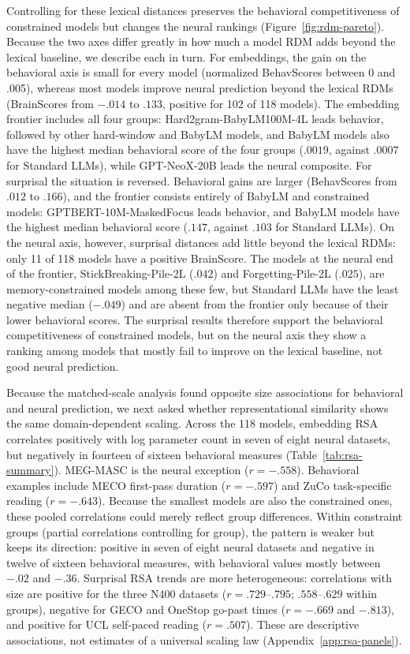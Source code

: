 Controlling for these lexical distances preserves the behavioral competitiveness of constrained models but changes the neural rankings (Figure~\ref{fig:rdm-pareto}). Because the two axes differ greatly in how much a model RDM adds beyond the lexical baseline, we describe each in turn. For embeddings, the gain on the behavioral axis is small for every model (normalized BehavScores between 0 and .005), whereas most models improve neural prediction beyond the lexical RDMs (BrainScores from $-.014$ to $.133$, positive for 102 of 118 models). The embedding frontier includes all four groups: Hard2gram-BabyLM100M-4L leads behavior, followed by other hard-window and BabyLM models, and BabyLM models also have the highest median behavioral score of the four groups ($.0019$, against $.0007$ for Standard LLMs), while GPT-NeoX-20B leads the neural composite. For surprisal the situation is reversed. Behavioral gains are larger (BehavScores from $.012$ to $.166$), and the frontier consists entirely of BabyLM and constrained models: GPTBERT-10M-MaskedFocus leads behavior, and BabyLM models have the highest median behavioral score ($.147$, against $.103$ for Standard LLMs). On the neural axis, however, surprisal distances add little beyond the lexical RDMs: only 11 of 118 models have a positive BrainScore. The models at the neural end of the frontier, StickBreaking-Pile-2L ($.042$) and Forgetting-Pile-2L ($.025$), are memory-constrained models among these few, but Standard LLMs have the least negative median ($-.049$) and are absent from the frontier only because of their lower behavioral scores. The surprisal results therefore support the behavioral competitiveness of constrained models, but on the neural axis they show a ranking among models that mostly fail to improve on the lexical baseline, not good neural prediction.

Because the matched-scale analysis found opposite size associations for behavioral and neural prediction, we next asked whether representational similarity shows the same domain-dependent scaling. Across the 118 models, embedding RSA correlates positively with log parameter count in seven of eight neural datasets, but negatively in fourteen of sixteen behavioral measures (Table~\ref{tab:rsa-summary}). MEG-MASC is the neural exception ($r=-.558$). Behavioral examples include MECO first-pass duration ($r=-.597$) and ZuCo task-specific reading ($r=-.643$). Because the smallest models are also the constrained ones, these pooled correlations could merely reflect group differences. Within constraint groups (partial correlations controlling for group), the pattern is weaker but keeps its direction: positive in seven of eight neural datasets and negative in twelve of sixteen behavioral measures, with behavioral values mostly between $-.02$ and $-.36$. Surprisal RSA trends are more heterogeneous: correlations with size are positive for the three N400 datasets ($r=.729$--$.795$; $.558$--$.629$ within groups), negative for GECO and OneStop go-past times ($r=-.669$ and $-.813$), and positive for UCL self-paced reading ($r=.507$). These are descriptive associations, not estimates of a universal scaling law (Appendix~\ref{app:rsa-panels}).

